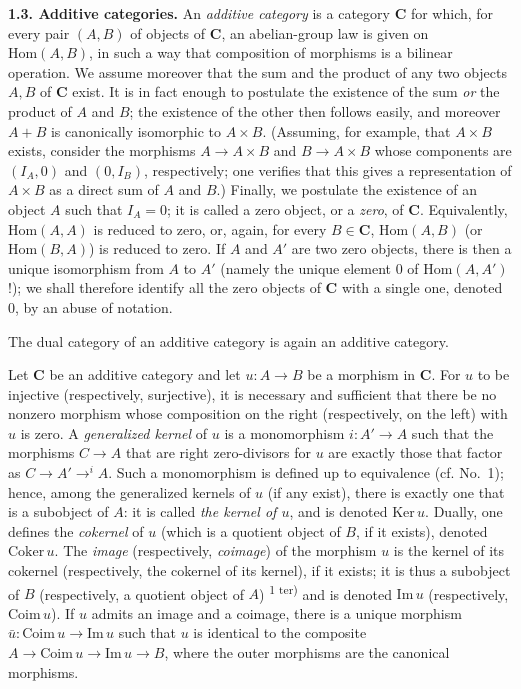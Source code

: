 
\noindent\textbf{1.3. Additive categories.}
An \textit{additive category} is a category $\mathbf{C}$ for which, for every pair
$(A,B)$ of objects of $\mathbf{C}$, an abelian-group law is given on
$\mathrm{Hom}(A,B)$, in such a way that composition of morphisms is a bilinear
operation.
We assume moreover that the sum and the product of any two objects $A,B$ of
$\mathbf{C}$ exist. It is in fact enough to postulate the existence of the sum
\textit{or} the product of $A$ and $B$; the existence of the other then follows
easily, and moreover $A+B$ is canonically isomorphic to $A\times B$. (Assuming,
for example, that $A\times B$ exists, consider the morphisms
$A\to A\times B$ and $B\to A\times B$ whose
components are $(I_A,0)$ and $(0,I_B)$, respectively; one verifies that this
gives a representation of $A\times B$ as a direct sum of $A$ and $B$.)
Finally, we postulate the existence of an object $A$ such that $I_A=0$; it is
called a zero object, or a \textit{zero}, of $\mathbf{C}$. Equivalently,
$\mathrm{Hom}(A,A)$ is reduced to zero, or, again, for every $B\in\mathbf{C}$,
$\mathrm{Hom}(A,B)$ (or $\mathrm{Hom}(B,A)$) is reduced to zero. If $A$ and
$A'$ are two zero objects, there is then a unique isomorphism from $A$ to $A'$
(namely the unique element $0$ of $\mathrm{Hom}(A,A')$!); we shall therefore
identify all the zero objects of $\mathbf{C}$ with a single one, denoted $0$, by an
abuse of notation.

The dual category of an additive category is again an additive category.

Let $\mathbf{C}$ be an additive category and let $u:A\to B$ be a morphism
in $\mathbf{C}$. For $u$ to be injective (respectively, surjective), it is necessary
and sufficient that there be no nonzero morphism whose composition on the
right (respectively, on the left) with $u$ is zero. A \textit{generalized
kernel} of $u$ is a monomorphism $i:A'\to A$ such that the
morphisms $C\to A$ that are right zero-divisors for $u$ are
exactly those that factor as $C\to A'\mathrel{\mathop{\to}^{i}}A$. Such a monomorphism is defined up to equivalence (cf.
No.~1); hence, among the generalized kernels of $u$ (if any exist), there is
exactly one that is a subobject of $A$: it is called \textit{the kernel of
$u$}, and is denoted $\mathrm{Ker}\,u$. Dually, one defines the
\textit{cokernel} of $u$ (which is a quotient object of $B$, if it exists),
denoted $\mathrm{Coker}\,u$. The \textit{image} (respectively,
\textit{coimage}) of the morphism $u$ is the kernel of its cokernel
(respectively, the cokernel of its kernel), if it exists; it is thus a
subobject of $B$ (respectively, a quotient object of $A$)%
\textsuperscript{1 ter)} and is
denoted $\mathrm{Im}\,u$ (respectively, $\mathrm{Coim}\,u$). If $u$ admits an
image and a coimage, there is a unique morphism
$\bar u:\mathrm{Coim}\,u\to\mathrm{Im}\,u$ such that $u$ is
identical to the composite $A\to\mathrm{Coim}\,u\to\mathrm{Im}\,u\to B$, where the outer morphisms are the canonical morphisms.

